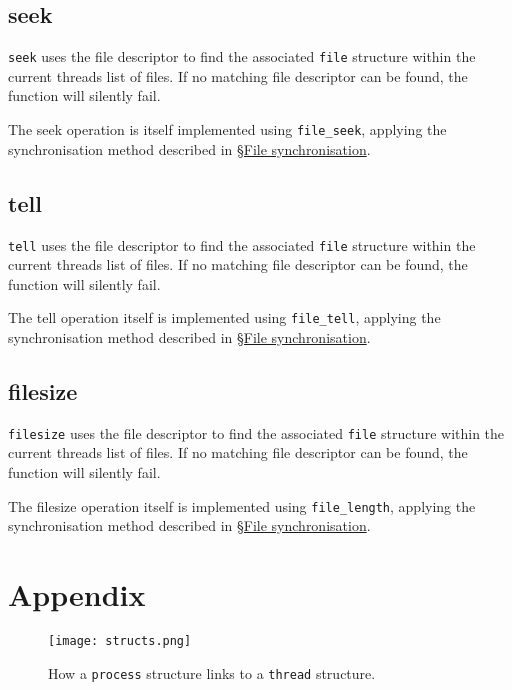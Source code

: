 \documentclass{article}
\begin{document}
\subsection{seek}
\label{sec:seek}

\verb!seek! uses the file descriptor to find the associated \verb!file! structure within the current threads list of files. If no matching file descriptor can be found, the function will silently fail.

The seek operation is itself implemented using \verb!file_seek!, applying the synchronisation method described in \hyperref[sec:file-synchronisation]{\S File synchronisation}.

\subsection{tell}
\label{sec:tell}

\verb!tell! uses the file descriptor to find the associated \verb!file! structure within the current threads list of files. If no matching file descriptor can be found, the function will silently fail.

The tell operation itself is implemented using \verb!file_tell!, applying the synchronisation method described in \hyperref[sec:file-synchronisation]{\S File synchronisation}.

\subsection{filesize}
\label{sec:filesize}

\verb!filesize! uses the file descriptor to find the associated \verb!file! structure within the current threads list of files. If no matching file descriptor can be found, the function will silently fail.

The filesize operation itself is implemented using \verb!file_length!, applying the synchronisation method described in \hyperref[sec:file-synchronisation]{\S File synchronisation}.

\newpage

\section{Appendix}
\label{sec:appendix}

\label{fig:1}
\begin{figure}[h]
    \texttt{[image: structs.png]}
    \centering
    \caption{How a \texttt{process} structure links to a \texttt{thread} structure.}
\end{figure}
\end{document}
